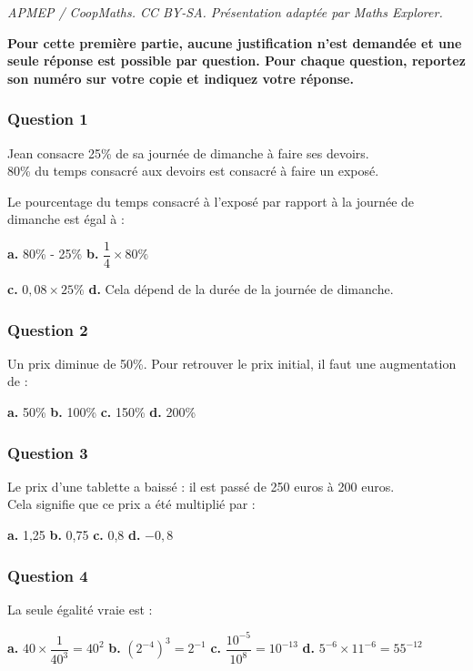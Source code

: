 \documentclass[10pt]{article}
\begin{document}
\noindent\textit{APMEP / CoopMaths. CC BY-SA. Présentation adaptée par Maths Explorer.}\par\medskip
\textbf{Pour cette première partie, aucune justification n'est demandée et une seule réponse est possible par question. Pour chaque question, reportez son numéro sur votre copie et indiquez votre réponse.}

\subsubsection*{Question 1}
Jean consacre 25\% de sa journée de dimanche à faire ses devoirs. \\
80\% du temps consacré aux devoirs est consacré à faire un exposé.

Le pourcentage du temps consacré à l'exposé par rapport à la journée de dimanche est égal à :

\textbf{a.} 80\% - 25\% \hfill \textbf{b.} $\dfrac{1}{4} \times 80\%$

\textbf{c.} $0,08 \times 25\%$ \hfill \textbf{d.} Cela dépend de la durée de la journée de dimanche.

\subsubsection*{Question 2}
Un prix diminue de 50\%. Pour retrouver le prix initial, il faut une augmentation de :

\textbf{a.} 50\% \hfill \textbf{b.} 100\% \hfill \textbf{c.} 150\% \hfill \textbf{d.} 200\%

\subsubsection*{Question 3}
Le prix d'une tablette a baissé : il est passé de 250 euros à 200 euros. \\
Cela signifie que ce prix a été multiplié par :

\textbf{a.} 1,25 \hfill \textbf{b.} 0,75 \hfill \textbf{c.} 0,8 \hfill \textbf{d.} $-0,8$

\subsubsection*{Question 4}
La seule égalité vraie est :

\textbf{a.} $40 \times \dfrac{1}{40^3} = 40^2$ \hfill \textbf{b.} $(2^{-4})^3 = 2^{-1}$ \hfill \textbf{c.} $\dfrac{10^{-5}}{10^8} = 10^{-13}$ \hfill \textbf{d.} $5^{-6} \times 11^{-6} = 55^{-12}$
\end{document}
